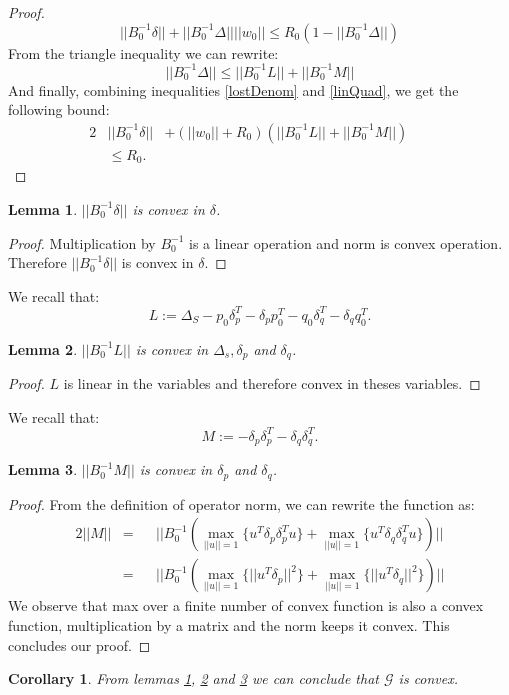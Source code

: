 \documentclass[11pt,twocolumn,varwidth=true,a4paper,fleqn]{article}
\newtheorem{lemma}{Lemma}
\newtheorem{corollary}{Corollary}
\begin{document}
\begin{proof}
\begin{equation}
||B_0^{-1}\delta|| + ||B_0^{-1}\Delta||||w_0||
\leq R_0(1 -||B_0^{-1}\Delta||)
\end{equation}
From the triangle inequality we can rewrite:
\begin{equation} \label{linQuad}
||B_0^{-1}\Delta|| \leq ||B_0^{-1}L||+||B_0^{-1}M||
\end{equation}
And finally, combining inequalities \ref{lostDenom} and \ref{linQuad},
we get the following bound:
\begin{alignat*}{2} \label{convexBound}
&||B_0^{-1}\delta|| &+ (||w_0||+R_0)(||B_0^{-1}L||+||B_0^{-1}M||) && \\ 
& \leq R_0. &&
\end{alignat*}
\end{proof}

\begin{lemma} \label{delta}
$||B_0^{-1}\delta||$ is convex in $\delta$.
\end{lemma}
\begin{proof}
Multiplication by $B_0^{-1}$ is a linear operation and norm is convex
operation. Therefore $||B_0^{-1}\delta||$ is convex in $\delta$.
\end{proof}

We recall that:
\begin{equation*} 
L:= \Delta_S - p_0\delta_p^T - \delta_pp_0^T - q_0\delta_q^T - \delta_qq_0^T.
\end{equation*}
\begin{lemma} \label{L}
$||B_0^{-1}L||$ is convex in $\Delta_s, \delta_p$
and $\delta_q$.
\end{lemma}
\begin{proof}
$L$ is linear in the variables and therefore convex in theses variables.

\end{proof}

We recall that:
\begin{equation*} 
M:= - \delta_p\delta_p^T - \delta_q\delta_q^T.
\end{equation*}

\begin{lemma} \label{M}
$||B_0^{-1}M||$ is convex in $\delta_p$
and $\delta_q$.
\end{lemma}
\begin{proof}
From the definition of operator norm, we can rewrite the function as:
\begin{alignat*} {2}
||M|| & = && ||B_0^{-1}(\max_{||u||=1}{\{u^T \delta_p\delta_p^T u\}} +
\max_{||u||=1}{\{u^T \delta_q\delta_q^T u\}})||\\
& = && ||B_0^{-1}(\max_{||u||=1}{\{||u^T \delta_p||^2\}} +
\max_{||u||=1}{\{||u^T \delta_q||^2\}})||
\end{alignat*}
We observe that max over a finite number of convex function is also a convex
function, multiplication by a matrix and the norm keeps it convex.
This concludes our proof.
\end{proof}

\begin{corollary}
From lemmas \ref{delta}, \ref{L} and \ref{M} we can conclude that $\mathcal{G}$
is convex.
\end{corollary}
\end{document}
